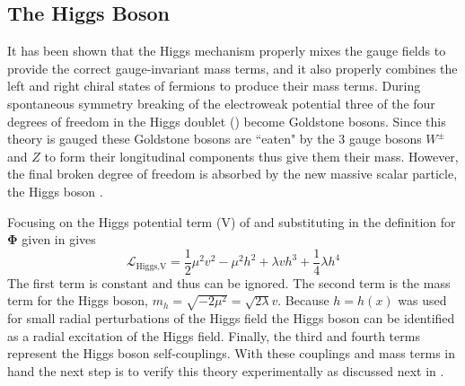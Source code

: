 \subsection{The Higgs Boson}

It has been shown that the Higgs mechanism properly mixes the gauge fields to
provide the correct gauge-invariant mass terms, and it also properly combines the
left and right chiral states of fermions to produce their mass terms.  During
spontaneous symmetry breaking of the electroweak potential three of the four
degrees of freedom in the Higgs doublet () become
Goldstone bosons.  Since this theory is gauged these Goldstone bosons are
``eaten" by the 3 gauge bosons $W^{\pm}$ and $Z$ to form their longitudinal
components thus give them their mass.  However, the final broken degree of
freedom is absorbed by the new massive scalar particle, the Higgs boson
\cite{Higgs:1964pj}.

Focusing on the Higgs potential term (V) of
 and substituting in the definition for
$\boldsymbol{\Phi}$ given in  gives
%
\begin{equation}
\mathcal{L}_\text{Higgs,V} = \frac{1}{2} \mu^{2} v^{2} - \mu^{2} h^{2} +
\lambda v h^{3} + \frac{1}{4} \lambda h^{4}
\end{equation}
%
The first term is constant and thus can be ignored.  The second term is the
mass term for the Higgs boson, $m_h = \sqrt{-2\mu^{2}} = \sqrt{2\lambda}v$.
Because $h = h(x)$ was used for small radial perturbations of the
Higgs field the Higgs boson can be identified as a radial excitation of the
Higgs field.  Finally, the third and fourth terms represent the Higgs boson
self-couplings.  With these couplings and mass terms in hand the next step is
to verify this theory experimentally as discussed next in .
